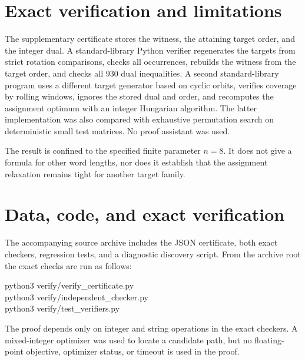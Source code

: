 \documentclass[11pt]{amsart}
\theoremstyle{definition}
\begin{document}
\section{Exact verification and limitations}

The supplementary certificate stores the witness, the attaining target order,
and the integer dual.  A standard-library Python verifier regenerates the
targets from strict rotation comparisons, checks all occurrences, rebuilds
the witness from the target order, and checks all 930 dual inequalities.
A second standard-library program uses a different target generator based on
cyclic orbits, verifies coverage by rolling windows, ignores the stored dual
and order, and recomputes the assignment optimum with an integer Hungarian
algorithm.  The latter implementation was also compared with exhaustive
permutation search on deterministic small test matrices.  No proof assistant
was used.

The result is confined to the specified finite parameter $n=8$.  It does not
give a formula for other word lengths, nor does it establish that the
assignment relaxation remains tight for another target family.

\section*{Data, code, and exact verification}

The accompanying source archive includes the JSON certificate, both exact
checkers, regression tests, and a diagnostic discovery script.  From the
archive root the exact checks are run as follows:
\begin{center}
\begin{minipage}{0.92\linewidth}
\ttfamily\small
python3 verify/verify\_certificate.py\\
python3 verify/independent\_checker.py\\
python3 verify/test\_verifiers.py
\end{minipage}
\end{center}
The proof depends only on integer and string operations in the exact checkers.
A mixed-integer optimizer was used to locate a candidate path, but no
floating-point objective, optimizer status, or timeout is used in the proof.



\end{document}
